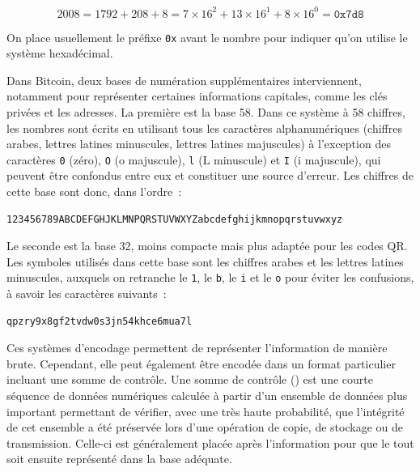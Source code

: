 { \small
\[
2008 = 1792 + 208 + 8 = 7 \times 16^2 + 13 \times 16^1 + 8 \times 16^0 = \mathtt{0x7d8}
\]
}

On place usuellement le préfixe \texttt{0x} avant le nombre pour indiquer qu'on utilise le système hexadécimal.


Dans Bitcoin, deux bases de numération supplémentaires interviennent, notamment pour représenter certaines informations capitales, comme les clés privées et les adresses. La première est la base 58. Dans ce système à 58 chiffres, les nombres sont écrits en utilisant tous les caractères alphanumériques (chiffres arabes, lettres latines minuscules, lettres latines majuscules) à l'exception des caractères \texttt{0} (zéro), \texttt{O} (o majuscule), \texttt{l} (L minuscule) et \texttt{I} (i majuscule), qui peuvent être confondus entre eux et constituer une source d'erreur. Les chiffres de cette base sont donc, dans l'ordre~:

\begin{Verbatim}[fontsize=\small]
123456789ABCDEFGHJKLMNPQRSTUVWXYZabcdefghijkmnopqrstuvwxyz
\end{Verbatim}


Le seconde est la base 32, moins compacte mais plus adaptée pour les codes QR. Les symboles utilisés dans cette base sont les chiffres arabes et les lettres latines minuscules, auxquels on retranche le \texttt{1}, le \texttt{b}, le \texttt{i} et le \texttt{o} pour éviter les confusions, à savoir les caractères suivants~:

\begin{Verbatim}[fontsize=\small]
qpzry9x8gf2tvdw0s3jn54khce6mua7l
\end{Verbatim}


Ces systèmes d'encodage permettent de représenter l'information de manière brute. Cependant, elle peut également être encodée dans un format particulier incluant une somme de contrôle. Une somme de contrôle () est une courte séquence de données numériques calculée à partir d'un ensemble de données plus important permettant de vérifier, avec une très haute probabilité, que l'intégrité de cet ensemble a été préservée lors d'une opération de copie, de stockage ou de transmission. Celle-ci est généralement placée après l'information pour que le tout soit ensuite représenté dans la base adéquate.

